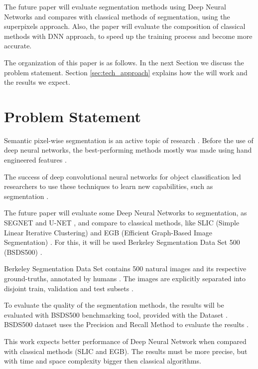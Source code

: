 \documentclass[10pt,twocolumn,letterpaper]{article}
\begin{document}
The future paper will evaluate segmentation methods using Deep Neural Networks and compares with classical methods of segmentation, using the superpixels approach. Also, the paper will evaluate the composition of classical methods with DNN approach, to speed up the training process and become more accurate.

The organization of this paper is as follows. In the next Section we discuss the problem statement. Section \ref{sec:tech_approach} explains how the will work and the results we expect.

\section{Problem Statement} \label{sec:prob_statement}


Semantic pixel-wise segmentation is an active topic of research \cite{SEGNET}. Before the use of deep neural networks, the  best-performing methods mostly was made using hand engineered features \cite{SEGNET}.

The success of deep convolutional neural networks for object classification led researchers to use these techniques to learn new capabilities, such as segmentation \cite{SEGNET}. 

The future paper will evaluate some Deep Neural Networks to segmentation, as SEGNET \cite{SEGNET} and U-NET \cite{UNET}, and compare to classical methods, like SLIC (Simple Linear Iterative Clustering) \cite{SLIC} and EGB (Efficient Graph-Based Image Segmentation) \cite{FELZENSZWALB}. For this, it will be used Berkeley Segmentation Data Set 500 (BSDS500) \cite{BSDS500}.

Berkeley Segmentation Data Set contains 500 natural images and its respective ground-truths, annotated by humans \cite{BSDS500}. The images are explicitly separated into disjoint train, validation and test subsets \cite{BSDS500}.

To evaluate the quality of the segmentation methods, the results will be evaluated with BSDS500 benchmarking tool, provided with the Dataset \cite{BSDS500}. BSDS500 dataset uses the Precision and Recall Method to evaluate the results \cite{BSDS500}.

This work expects better performance of Deep Neural Network when compared with classical methods (SLIC and EGB). The results must be more precise, but with time and space complexity bigger then classical algorithms. 
\end{document}
